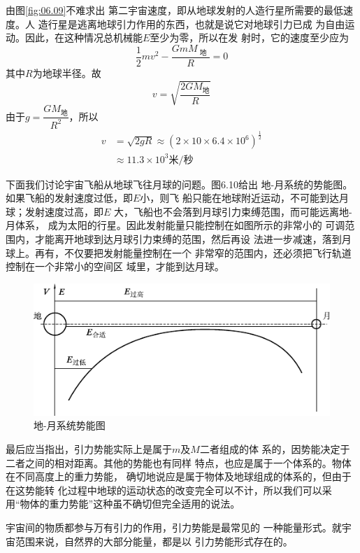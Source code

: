 由图\ref{fig:06.09}不难求出
第二宇宙速度，即从地球发射的人造行星所需要的最低速度。人
造行星是逃离地球引力作用的东西，也就是说它对地球引力已成
为自由运动。因此，在这种情况总机械能$ E $至少为零，所以在发
射时，它的速度至少应为
\begin{equation*}
  \frac { 1 } { 2 } m v ^ { 2 } - \frac { G m M _ \text { 地 } } { R } = 0
\end{equation*}
其中$ R $为地球半径。故
\begin{equation*}
  v = \sqrt{\frac { 2 G M _ \text{地} } { R } }
\end{equation*}
由于$ g = \dfrac { G M _ \text{地} } { R ^ { 2 } } $，所以
\clearpage
\begin{equation*}
  \begin{aligned}
    v & = \sqrt { 2 g R } \approx \left( 2 \times 10 \times 6.4 \times 10 ^ { 6 } \right) ^ { \frac { 1 } { 2 } } \\
      & \approx 11.3 \times 10 ^ { 3 } \text{米/秒}
  \end{aligned}
\end{equation*}

下面我们讨论宇宙飞船从地球飞往月球的问题。图6.10给出
地-月系统的势能图。如果飞船的发射速度过低，即$ E $小，则飞
船只能在地球附近运动，不可能到达月球；发射速度过高，即$ E $
大，飞船也不会落到月球引力束缚范围，而可能远离地-月体系，
成为太阳的行星。因此发射能量只能控制在如图所示的非常小的
可调范围内，才能离开地球到达月球引力束缚的范围，然后再设
法进一步减速，落到月球上。再有，不仅要把发射能量控制在一个
非常窄的范围内，还必须把飞行轨道控制在一个非常小的空间区
域里，才能到达月球。

\begin{figure}[h]
  \centering
  \includegraphics{figure/fig06.10}
  \caption{地-月系统势能图}
  \label{fig:06.10}
  \vspace{-0.8em}
\end{figure}

最后应当指出，引力势能实际上是属于$ m $及$ M $二者组成的体
系的，因势能决定于二者之间的相对距离。其他的势能也有同样
特点，也应是属于一个体系的。物体在不同高度上的重力势能，
确切地说应是属于物体及地球组成的体系的，但由于在这势能转
化过程中地球的运动状态的改变完全可以不计，所以我们可以采
用“物体的重力势能”这种虽不确切但完全适用的说法。

宇宙间的物质都参与万有引力的作用，引力势能是最常见的
一种能量形式。就宇宙范围来说，自然界的大部分能量，都是以
引力势能形式存在的。
